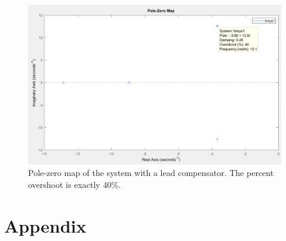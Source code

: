 \documentclass[12pt,a4paper]{article}
\begin{document}
\begin{enumerate}[(a)]
\begin{figure}[h!]
	\centering
	\includegraphics[width=0.9\linewidth]{compensator-pole.png}
	\caption{Pole-zero map of the system with a lead compensator. The percent overshoot is exactly 40\%.}
	\label{fig:comp-design}
\end{figure}

\end{enumerate}

\clearpage

\section*{Appendix}
\end{document}
